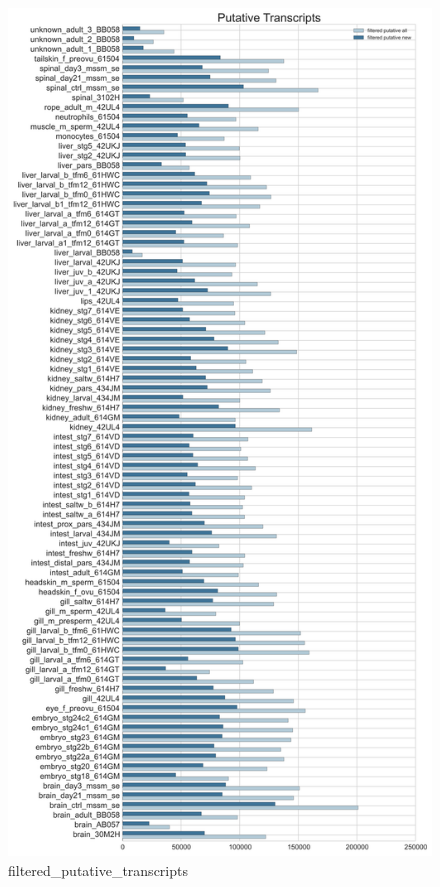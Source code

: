 \documentclass{article}
\begin{document}
\begin{figure}[htbp]
\centering
\includegraphics{filtered_putative_transcripts.svg}
\caption{filtered\_putative\_transcripts}
\end{figure}
\end{document}
